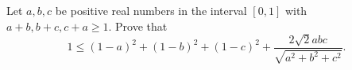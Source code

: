 Let $a, b, c$ be positive real numbers in the interval $[0, 1]$ with $a+b, b+c, c+a \ge 1$. Prove that \[1 \le (1-a)^2 + (1-b)^2 + (1-c)^2 +\frac{2\sqrt{2} abc}{\sqrt{a^2+b^2+c^2}}.\]